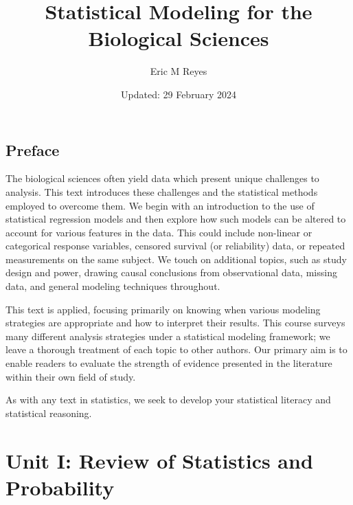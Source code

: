 \documentclass[
  letterpaper,
  DIV=11,
  numbers=noendperiod]{scrreprt}
\title{Statistical Modeling for the Biological Sciences}
\author{Eric M Reyes}
\date{Updated: 29 February 2024}
\renewcommand*\contentsname{Table of contents}
\newcommand\contentsname{Table of contents}
\theoremstyle{definition}
\theoremstyle{definition}
\theoremstyle{remark}
\begin{document}
\maketitle
\ifdefined\Shaded\renewenvironment{Shaded}{\begin{tcolorbox}[boxrule=0pt, borderline west={3pt}{0pt}{shadecolor}, interior hidden, enhanced, frame hidden, breakable, sharp corners]}{\end{tcolorbox}}\fi

\renewcommand*\contentsname{Table of contents}
{
\hypersetup{linkcolor=}
\setcounter{tocdepth}{2}
\tableofcontents
}

\hypertarget{preface}{%
\chapter*{Preface}\label{preface}}


The biological sciences often yield data which present unique challenges
to analysis. This text introduces these challenges and the statistical
methods employed to overcome them. We begin with an introduction to the
use of statistical regression models and then explore how such models
can be altered to account for various features in the data. This could
include non-linear or categorical response variables, censored survival
(or reliability) data, or repeated measurements on the same subject. We
touch on additional topics, such as study design and power, drawing
causal conclusions from observational data, missing data, and general
modeling techniques throughout.

This text is applied, focusing primarily on knowing when various
modeling strategies are appropriate and how to interpret their results.
This course surveys many different analysis strategies under a
statistical modeling framework; we leave a thorough treatment of each
topic to other authors. Our primary aim is to enable readers to evaluate
the strength of evidence presented in the literature within their own
field of study.

As with any text in statistics, we seek to develop your statistical
literacy and statistical reasoning.

\part{Unit I: Review of Statistics and Probability}
\end{document}
